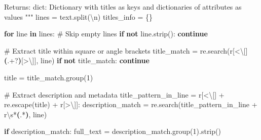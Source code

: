 \documentclass[
  11pt,
  letterpaper,
]{book}
\newenvironment{Shaded}{\begin{snugshade}}{\end{snugshade}}
\newcommand{\CharTok}[1]{\textcolor[rgb]{0.13,0.47,0.30}{#1}}
\newcommand{\CommentTok}[1]{\textcolor[rgb]{0.37,0.37,0.37}{#1}}
\newcommand{\ControlFlowTok}[1]{\textcolor[rgb]{0.00,0.23,0.31}{\textbf{#1}}}
\newcommand{\DecValTok}[1]{\textcolor[rgb]{0.68,0.00,0.00}{#1}}
\newcommand{\KeywordTok}[1]{\textcolor[rgb]{0.00,0.23,0.31}{\textbf{#1}}}
\newcommand{\NormalTok}[1]{\textcolor[rgb]{0.00,0.23,0.31}{#1}}
\newcommand{\OperatorTok}[1]{\textcolor[rgb]{0.37,0.37,0.37}{#1}}
\newcommand{\PreprocessorTok}[1]{\textcolor[rgb]{0.68,0.00,0.00}{#1}}
\newcommand{\StringTok}[1]{\textcolor[rgb]{0.13,0.47,0.30}{#1}}
\newcommand{\VerbatimStringTok}[1]{\textcolor[rgb]{0.13,0.47,0.30}{#1}}
\begin{document}
\begin{Shaded}
\begin{Highlighting}[]
\CommentTok{    Returns:}
\CommentTok{        dict: Dictionary with titles as keys and dictionaries of attributes as values}
\CommentTok{    """}
\NormalTok{    lines }\OperatorTok{=}\NormalTok{ text.split(}\StringTok{\textquotesingle{}}\CharTok{\textbackslash{}n}\StringTok{\textquotesingle{}}\NormalTok{)}
\NormalTok{    titles\_info }\OperatorTok{=}\NormalTok{ \{\}}

    \ControlFlowTok{for}\NormalTok{ line }\KeywordTok{in}\NormalTok{ lines:}
        \CommentTok{\# Skip empty lines}
        \ControlFlowTok{if} \KeywordTok{not}\NormalTok{ line.strip():}
            \ControlFlowTok{continue}

        \CommentTok{\# Extract title within square or angle brackets}
\NormalTok{        title\_match }\OperatorTok{=}\NormalTok{ re.search(}\VerbatimStringTok{r\textquotesingle{}}\PreprocessorTok{[\textless{}}\CharTok{\textbackslash{}[}\PreprocessorTok{]}\KeywordTok{(}\DecValTok{.}\OperatorTok{+?}\KeywordTok{)}\PreprocessorTok{[\textgreater{}}\CharTok{\textbackslash{}]}\PreprocessorTok{]}\VerbatimStringTok{\textquotesingle{}}\NormalTok{, line)}
        \ControlFlowTok{if} \KeywordTok{not}\NormalTok{ title\_match:}
            \ControlFlowTok{continue}

\NormalTok{        title }\OperatorTok{=}\NormalTok{ title\_match.group(}\DecValTok{1}\NormalTok{)}

        \CommentTok{\# Extract description and metadata}
\NormalTok{        title\_pattern\_in\_line }\OperatorTok{=} \VerbatimStringTok{r\textquotesingle{}}\PreprocessorTok{[\textless{}}\CharTok{\textbackslash{}[}\PreprocessorTok{]}\VerbatimStringTok{\textquotesingle{}} \OperatorTok{+}\NormalTok{ re.escape(title) }\OperatorTok{+} \VerbatimStringTok{r\textquotesingle{}}\PreprocessorTok{[\textgreater{}}\CharTok{\textbackslash{}]}\PreprocessorTok{]}\VerbatimStringTok{:\textquotesingle{}}
\NormalTok{        description\_match }\OperatorTok{=}\NormalTok{ re.search(title\_pattern\_in\_line }\OperatorTok{+} \VerbatimStringTok{r\textquotesingle{}}\DecValTok{\textbackslash{}s}\OperatorTok{*}\KeywordTok{(}\DecValTok{.}\OperatorTok{*}\KeywordTok{)}\VerbatimStringTok{\textquotesingle{}}\NormalTok{, line)}

        \ControlFlowTok{if}\NormalTok{ description\_match:}
\NormalTok{            full\_text }\OperatorTok{=}\NormalTok{ description\_match.group(}\DecValTok{1}\NormalTok{).strip()}


\end{Highlighting}
\end{Shaded}
\end{document}

